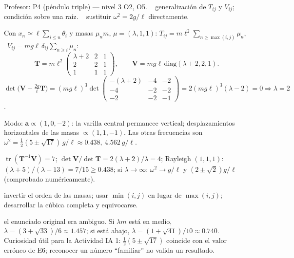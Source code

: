 \documentclass[spanish]{beamer}
\newcommand{\Tm}{\mathbf{T}}              %
\newcommand{\Vm}{\mathbf{V}}              %
\newcommand{\ba}{\boldsymbol{a}}          %
\begin{document}
\begin{frame}{Profesor: P4 (péndulo triple) --- nivel 3}
\scriptsize
{} O2, O5. \  generalización de $T_{ij}$ y $V_{ij}$; condición sobre una raíz. \  sustituir $\omega^2=2g/\ell$ directamente.

 Con $x_n\simeq\ell\sum_{i\le n}\theta_i$ y masas $\mu_n m$, $\mu=(\lambda,1,1)$: $T_{ij}=m\ell^2\sum_{n\ge\max(i,j)}\mu_n$, \ $V_{ij}=mg\ell\,\delta_{ij}\sum_{n\ge i}\mu_n$:
\[
\Tm=m\ell^2\begin{pmatrix}\lambda+2&2&1\\2&2&1\\1&1&1\end{pmatrix},\qquad \Vm=mg\ell\,\mathrm{diag}(\lambda+2,2,1).
\]
$\det\big(\Vm-\tfrac{2g}{\ell}\Tm\big)=(mg\ell)^3\det\begin{pmatrix}-(\lambda+2)&-4&-2\\-4&-2&-2\\-2&-2&-1\end{pmatrix}=2(mg\ell)^3(\lambda-2)=0\Rightarrow\boxed{\lambda=2}$.

Modo: $\ba\propto(1,0,-2)$: la varilla central permanece vertical; desplazamientos horizontales de las masas $\propto(1,1,-1)$. Las otras frecuencias son $\omega^2=\tfrac12(5\pm\sqrt{17})\,g/\ell\approx0.438,\ 4.562\ g/\ell$.

 $\operatorname{tr}(\Tm^{-1}\Vm)=7$; $\det\Vm/\det\Tm=2(\lambda+2)/\lambda=4$; Rayleigh $(1,1,1)$: $(\lambda+5)/(\lambda+13)=7/15\ge0.438$; si $\lambda\to\infty$: $\omega^2\to g/\ell$ y $(2\pm\sqrt2)g/\ell$ (comprobado numéricamente).

 invertir el orden de las masas; usar $\min(i,j)$ en lugar de $\max(i,j)$; desarrollar la cúbica completa y equivocarse.

 el enunciado original era ambiguo. Si $\lambda m$ está en medio, $\lambda=(3+\sqrt{33})/6\approx1.457$; si está abajo, $\lambda=(1+\sqrt{41})/10\approx0.740$. Curiosidad útil para la Actividad IA 1: $\tfrac12(5\pm\sqrt{17})$ coincide con el valor erróneo de E6; reconocer un número ``familiar'' no valida un resultado.
\end{frame}
\end{document}
